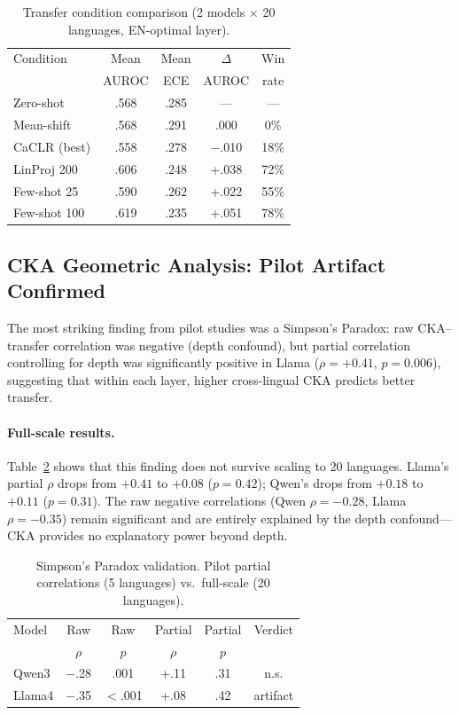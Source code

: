 \documentclass[11pt,a4paper]{article}
\newcommand{\auroc}{AUROC}
\newcommand{\ece}{ECE}
\begin{document}
\begin{table}[t]
\centering
\small
\caption{Transfer condition comparison (2 models $\times$ 20 languages, EN-optimal layer).}
\label{tab:transfer_conditions}
\begin{tabular}{lcccc}
\toprule
Condition & Mean & Mean & $\Delta$ & Win \\
          & \auroc{} & \ece{} & \auroc{} & rate \\
\midrule
Zero-shot    & .568 & .285 & ---    & ---  \\
Mean-shift   & .568 & .291 & .000   & 0\%  \\
CaCLR (best) & .558 & .278 & $-$.010 & 18\% \\
LinProj 200  & .606 & .248 & +.038  & 72\% \\
Few-shot 25  & .590 & .262 & +.022  & 55\% \\
Few-shot 100 & .619 & .235 & +.051  & 78\% \\
\bottomrule
\end{tabular}
\end{table}

\subsection{CKA Geometric Analysis: Pilot Artifact Confirmed}
\label{sec:cka}

The most striking finding from pilot studies was a Simpson's Paradox: raw CKA--transfer correlation was negative (depth confound), but partial correlation controlling for depth was significantly positive in Llama ($\rho = +0.41$, $p = 0.006$), suggesting that within each layer, higher cross-lingual CKA predicts better transfer.

\paragraph{Full-scale results.}
Table~\ref{tab:simpson} shows that this finding does not survive scaling to 20 languages.
Llama's partial $\rho$ drops from $+0.41$ to $+0.08$ ($p = 0.42$); Qwen's drops from $+0.18$ to $+0.11$ ($p = 0.31$).
The raw negative correlations (Qwen $\rho = -0.28$, Llama $\rho = -0.35$) remain significant and are entirely explained by the depth confound---CKA provides no explanatory power beyond depth.

\begin{table}[t]
\centering
\small
\caption{Simpson's Paradox validation. Pilot partial correlations (5 languages) vs.\ full-scale (20 languages).}
\label{tab:simpson}
\begin{tabular}{lccccc}
\toprule
Model & Raw & Raw & Partial & Partial & Verdict \\
      & $\rho$ & $p$ & $\rho$ & $p$ & \\
\midrule
Qwen3 & $-$.28 & .001 & +.11 & .31 & n.s. \\
Llama4 & $-$.35 & {$<$}.001 & +.08 & .42 & artifact \\
\bottomrule
\end{tabular}
\end{table}
\end{document}
